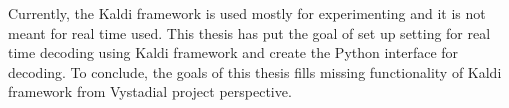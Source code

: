 
Currently, the Kaldi framework is used mostly for experimenting and it is not meant for real time used.
This thesis has put the goal of set up setting for real time decoding using Kaldi framework and create the Python interface for decoding. To conclude, the goals of this thesis fills missing functionality of Kaldi framework from Vystadial project perspective. 




